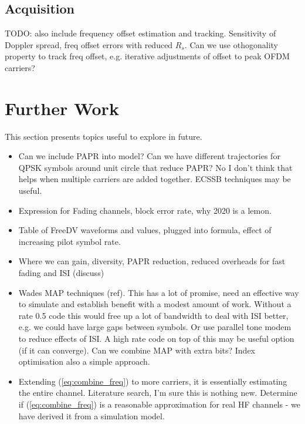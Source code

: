 \documentclass{article}
\begin{document}
\subsection{Acquisition}

TODO: also include frequency offset estimation and tracking.  Sensitivity of Doppler spread, freq offset errors with reduced $R_s$. Can we use othogonality property to track freq offset, e.g. iterative adjustments of offset to peak OFDM carriers?

\section{Further Work}

This section presents topics useful to explore in future.

\begin{itemize}
\item Can we include PAPR into model? Can we have different trajectories for QPSK symbols around unit circle that reduce PAPR?  No I don't think that helps when multiple carriers are added together.  ECSSB techniques may be useful.
\item Expression for Fading channels, block error rate, why 2020 is a lemon.
\item Table of FreeDV waveforms and values, plugged into formula, effect of increasing pilot symbol rate.
\item Where we can gain, diversity, PAPR reduction, reduced overheads for fast fading and ISI (discuss)
\item Wades MAP techniques (ref).  This has a lot of promise, need an effective way to simulate and establish benefit with a modest amount of work.  Without a rate 0.5 code this would free up a lot of bandwidth to deal with ISI better, e.g. we could have large gaps between symbols.  Or use parallel tone modem to reduce effects of ISI.  A high rate code on top of this may be useful option (if it can converge).   Can we combine MAP with extra bits?  Index optimisation also a simple approach.
\item Extending (\ref{eq:combine_freq}) to more carriers, it is essentially estimating the entire channel.  Literature search, I'm sure this is nothing new.  Determine if (\ref{eq:combine_freq}) is a reasonable approximation for real HF channels - we have derived it from a simulation model.
\end{itemize} 

\nocite{*}


\end{document}
